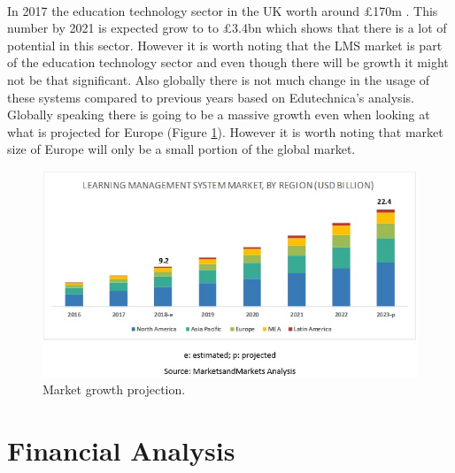 \documentclass[]{article}
\begin{document}
\paragraph{}
In 2017 the education technology sector in the UK worth around £170m \cite{Government-Strategy}. This number by 2021 is expected grow to to £3.4bn which shows that there is a lot of potential in this sector. However it is worth noting that the LMS market is part of the education technology sector and even though there will be growth it might not be that significant. Also globally there is not much change \cite{VLE-2020-IMG} in the usage of these systems compared to previous years based on Edutechnica's analysis. Globally speaking there is going to be a massive growth \cite{Markets-and-Markets} even when looking at what is projected for Europe (Figure \ref{fig:Markets-LMS}). However it is worth noting that market size of Europe will only be a small portion of the global market.

\begin{figure}
    \centering
    \includegraphics[width =1.2\linewidth]{learning-management-systems-market5.jpg}
    \caption{Market growth projection. \cite{Markets-and-Markets}}
    \label{fig:Markets-LMS}
\end{figure}

\section{Financial Analysis}
\end{document}
